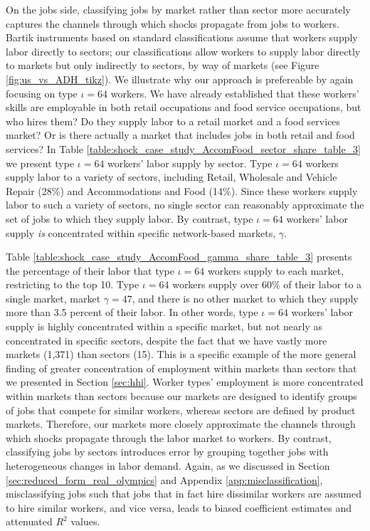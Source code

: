 \documentclass[12pt]{article}
\def\g{\gamma}
\def\i{\iota}
\theoremstyle{definition}
\theoremstyle{plain}
\begin{document}



On the jobs side, classifying jobs by market rather than sector more accurately captures the channels through which shocks propagate from jobs to workers. Bartik instruments based on standard classifications assume that workers supply labor directly to sectors; our classifications allow workers to supply labor directly to markets but only indirectly to sectors, by way of markets (see Figure \ref{fig:us_vs_ADH_tikz}). We illustrate why our approach is prefereable by again focusing on type $\i=64$ workers. We have already established that these workers' skills are employable in both retail occupations and food service occupations, but who hires them? Do they supply labor to a retail market and a food services market? Or is there actually a market that includes jobs in both retail and food services? In Table \ref{table:shock_case_study_AccomFood_sector_share_table_3} we present type $\i=64$ workers' labor supply by sector. Type $\i=64$ workers supply labor to a variety of sectors, including Retail, Wholesale and Vehicle Repair (28\%) and Accommodations and Food (14\%). Since these workers supply labor to such a  variety of sectors, no single sector can reasonably approximate the set of jobs to which they supply labor. By contrast, type $\i=64$ workers' labor supply \emph{is} concentrated within specific network-based markets, $\g$. 


Table \ref{table:shock_case_study_AccomFood_gamma_share_table_3} presents the percentage of their labor that type $\i=64$ workers supply to each market, restricting to the top 10. Type $\i=64$ workers supply over 60\% of their labor to a single market, market $\g=47$, and there is no other market to which they supply more than 3.5 percent of their labor. In other words, type $\i=64$ workers' labor supply is highly concentrated within a specific market, but not nearly as concentrated in specific sectors, despite the fact that we have vastly more markets (1,371) than sectors (15).  This is a specific example of the more general finding of greater concentration of employment within markets than sectors that we presented in Section \ref{sec:hhi}. Worker types' employment is more concentrated within markets than sectors because our markets are designed to identify groups of jobs that compete for similar workers, whereas sectors are defined by product markets. Therefore, our markets more closely approximate the channels through which shocks propagate through the labor market to workers. By contrast, classifying jobs by sectors introduces error by grouping together jobs with heterogeneous changes in labor demand.  Again, as we discussed in Section \ref{sec:reduced_form_real_olympics} and Appendix \ref{app:misclassification}, misclassifying jobs such that jobs that in fact hire dissimilar workers are assumed to hire similar workers, and vice versa, leads to biased coefficient estimates and attenuated $R^2$ values.
\end{document}
